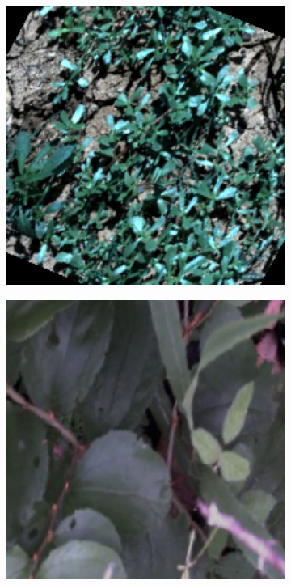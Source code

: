 \begin{figure}[h]
\begin{subfigure}{0.3\textwidth}
        \includegraphics[width=\textwidth]{figuras/implementacion/dataset/imagenes_datagen_2.png}
        \caption{}
    \end{subfigure}
    \hfill
    \begin{subfigure}{0.3\textwidth}
        \includegraphics[width=\textwidth]{figuras/implementacion/dataset/imagenes_datagen_3.png}

\end{subfigure}
\end{figure}
